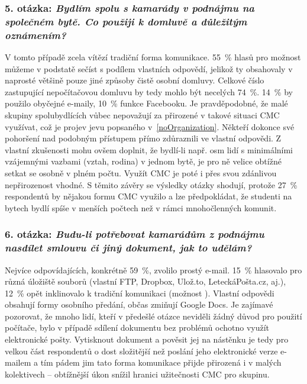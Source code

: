 \documentclass[12pt,oneside,final]{fithesis2}
\begin{document}
\subsubsection*{\textbf{5. otázka:} \emph{Bydlím spolu s kamarády v podnájmu na společném bytě. Co použiji k domluvě a důležitým oznámením?}}
V tomto případě zcela vítězí tradiční forma komunikace. 55~\% hlasů pro možnost  můžeme v podstatě sečíst s podílem vlastních odpovědí, jelikož ty obsahovaly v naprosté většině pouze jiné způsoby čistě osobní domluvy. Celkové číslo zastupující nepočítačovou domluvu by tedy mohlo být necelých 74~\%. 14~\% by použilo obyčejné e-maily, 10~\% funkce Facebooku. Je pravděpodobné, že malé skupiny spolubydlících vůbec nepovažují za přirozené v takové situaci CMC využívat, což je projev jevu popsaného v~\ref{noOrganization}. Někteří dokonce své pohoršení nad podobným přístupem přímo zdůraznili ve vlastní odpovědi. Z vlastní zkušenosti mohu ovšem doplnit, že bydlí-li např. osm lidí s minimálními vzájemnými vazbami (vztah, rodina) v jednom bytě, je pro ně velice obtížné setkat se osobně v plném počtu. Využít CMC je poté i přes svou zdánlivou nepřirozenost vhodné. S těmito závěry se výsledky otázky shodují, protože 27~\% respondentů by nějakou formu CMC využilo a lze předpokládat, že studenti na bytech bydlí spíše v menších počtech než v rámci mnohočlenných komunit.

\subsubsection*{\textbf{6. otázka:} \emph{Budu-li potřebovat kamarádům z podnájmu nasdílet smlouvu či jiný dokument, jak to udělám?}}
Nejvíce odpovídajících, konkrétně 59~\%, zvolilo prostý e-mail. 15~\% hlasovalo pro různá úložiště souborů (vlastní FTP, Dropbox, Ulož.to, LeteckáPošta.cz, aj.), 12~\% opět inklinovalo k tradiční komunikaci (možnost ). Vlastní odpovědi obsahují formy osobního předání, občas zmiňují Google Docs. Je zajímavé pozorovat, že mnoho lidí, kteří v předešlé otázce neviděli žádný důvod pro použití počítače, bylo v případě sdílení dokumentu bez problémů ochotno využít elektronické pošty. Vytisknout dokument a pověsit jej na nástěnku je tedy pro velkou část respondentů o dost složitější než poslání jeho elektronické verze e-mailem a tím pádem jim tato forma komunikace přijde přirozená i v malých kolektivech -- obtížnější úkon snížil hranici užitečnosti CMC pro skupinu.
\end{document}
